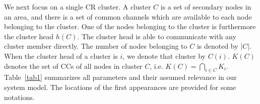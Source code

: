 \documentclass[times]{ettauth}
\theoremstyle{mytheoremstyle}
\theoremstyle{mytheoremstyle}
\theoremstyle{mytheoremstyle}
\begin{document}
We next focus on a single CR cluster. 
A cluster $C$ is a set of secondary nodes in an area, and there is a set of common channels which are available to each node belonging to the cluster.
One of the nodes belonging to the cluster is furthermore the cluster head $h(C)$.
The cluster head is able to communicate with any cluster member directly.
The number of nodes belonging to $C$ is denoted by $|C|$.
When the cluster head of a cluster is $i$, we denote that cluster by $C(i)$.
$K(C)$ denotes the set of CCs of all nodes in cluster $C$, i.e. $ K(C) = \bigcap_{i\in C} K_i$.
Table~\ref{tab1} summarizes all parameters and their assumed relevance in our system model. 
The locations of the first appearances are provided for some notations.
\end{document}
